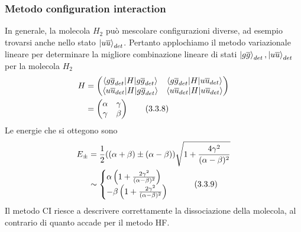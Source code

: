 \documentclass{article}
\begin{document}
\subsubsection*{Metodo configuration interaction}
In generale, la molecola $H_2$ può mescolare configurazioni diverse, ad esempio trovarsi anche nello stato $\ket{u\overline{u}}_{det}$. Pertanto applochiamo il metodo variazionale lineare per determinare la migliore combinazione lineare di stati $\ket{g\overline{g}}_{det}, \ket{u\overline{u}}_{det}$ per la molecola $H_2$ 
\begin{align}
    H &= \begin{pmatrix}
        \braket{g\overline{g}_{det}|H|g\overline{g}_{det}} & \braket{g\overline{g}_{det}|H|u\overline{u}_{det}} \\
        \braket{u\overline{u}_{det}|H|g\overline{g}_{det}} & \braket{u\overline{u}_{det}|H|u\overline{u}_{det}}
    \end{pmatrix} \notag \\
    &= \begin{pmatrix}
        \alpha & \gamma \\
        \gamma & \beta
    \end{pmatrix} \tag{3.3.8}
\end{align}
Le energie che si ottegono sono 
\begin{align}
    E_{\pm} &= \frac{1}{2}((\alpha + \beta) \pm (\alpha - \beta))\sqrt{1 + \frac{4\gamma^2}{(\alpha - \beta)^2}} \notag \\
    &\sim \begin{cases}
        \alpha\left(1 + \frac{2\gamma^2}{(\alpha - \beta)^2}\right) \\
        -\beta\left(1 + \frac{2\gamma^2}{(\alpha - \beta)^2}\right)
    \end{cases} \tag{3.3.9}
\end{align}
Il metodo CI riesce a descrivere correttamente la dissociazione della molecola, al contrario di quanto accade per il metodo HF.
\end{document}
